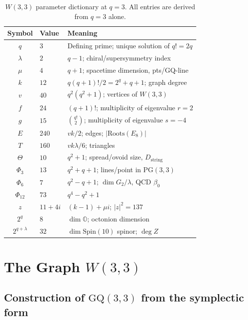 \documentclass[12pt,a4paper]{article}
\theoremstyle{definition}
\newcommand{\PG}{\mathrm{PG}}
\newcommand{\Phithree}{\Phi_3}
\newcommand{\Phisix}{\Phi_6}
\newcommand{\Phitwelve}{\Phi_{12}}
\newcommand{\OO}{\mathbb{O}}
\begin{document}
\begin{table}[h]
\centering
\caption{$W(3,3)$ parameter dictionary at $q=3$.  All entries are derived
from $q=3$ alone.}
\label{tab:params}
\renewcommand{\arraystretch}{1.3}
\begin{tabular}{cll}
\toprule
Symbol & Value & Meaning \\
\midrule
$q$            & $3$  & Defining prime; unique solution of $q!=2q$ \\
$\lambda$      & $2$  & $q-1$; chiral/supersymmetry index \\
$\mu$          & $4$  & $q+1$; spacetime dimension, pts/GQ-line \\
$k$            & $12$ & $q(q+1)!/ 2 = 2^q+q+1$; graph degree \\
$v$            & $40$ & $q^2(q^2+1)$; vertices of $W(3,3)$ \\
$f$            & $24$ & $(q+1)!$; multiplicity of eigenvalue $r=2$ \\
$g$            & $15$ & $\binom{q!}{2}$; multiplicity of eigenvalue $s=-4$ \\
$E$            & $240$ & $vk/2$; edges; $|\mathrm{Roots}(E_8)|$ \\
$T$            & $160$ & $vk\lambda/6$; triangles \\
$\Theta$       & $10$ & $q^2+1$; spread/ovoid size, $D_{\text{string}}$ \\
$\Phithree$    & $13$ & $q^2+q+1$; lines/point in $\PG(3,3)$ \\
$\Phisix$      & $7$  & $q^2-q+1$; $\dim G_2/\lambda$, QCD $\beta_0$ \\
$\Phitwelve$   & $73$ & $q^4-q^2+1$ \\
$z$            & $11+4i$ & $(k-1)+\mu i$; $|z|^2=137$ \\
$2^q$          & $8$  & $\dim\OO$; octonion dimension \\
$2^{q+\lambda}$& $32$ & $\dim\mathrm{Spin}(10)$ spinor; $\deg Z$ \\
\bottomrule
\end{tabular}
\end{table}


\section{The Graph \texorpdfstring{$W(3,3)$}{W(3,3)}}
\label{sec:W33}

\subsection{Construction of \texorpdfstring{$\mathrm{GQ}(3,3)$}{GQ(3,3)} from the symplectic form}
\end{document}
